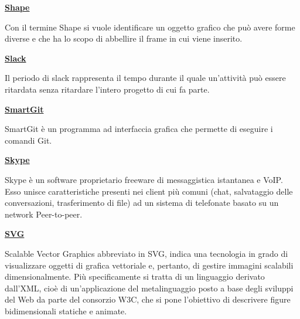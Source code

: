 \bigskip
\begin{addmargin}[0em]{0em}
	\textbf{\underline{Shape}}
\end{addmargin} 
	
\medskip
\begin{addmargin}[5em]{1em}	
Con il termine Shape si vuole identificare un oggetto grafico che può avere forme diverse e che ha lo scopo di abbellire il frame in cui viene inserito.
\end{addmargin}	

\bigskip
\begin{addmargin}[0em]{0em}
	\textbf{\underline{Slack}}
\end{addmargin} 
	
\medskip
\begin{addmargin}[5em]{1em}	
Il periodo di slack rappresenta il tempo durante il quale un'attività può essere ritardata senza ritardare l'intero progetto di cui fa parte.
\end{addmargin}	

\bigskip
\begin{addmargin}[0em]{0em}		
	\textbf{\underline{SmartGit}}
\end{addmargin} 
	
\medskip
\begin{addmargin}[5em]{1em}	
SmartGit è un programma ad interfaccia grafica che permette di eseguire i comandi Git.	
\end{addmargin}	

\bigskip
\begin{addmargin}[0em]{0em}		
	\textbf{\underline{Skype}}
\end{addmargin}
	 
\medskip
\begin{addmargin}[5em]{1em}	
Skype è un software proprietario freeware di messaggistica istantanea e VoIP. Esso unisce caratteristiche presenti nei client più comuni (chat, salvataggio delle conversazioni, trasferimento di file) ad un sistema di telefonate basato su un network Peer-to-peer.  
\end{addmargin}	

\bigskip
\begin{addmargin}[0em]{0em}		
	\textbf{\underline{SVG}}
	\end{addmargin} 
	
\medskip
\begin{addmargin}[5em]{1em}	
Scalable Vector Graphics abbreviato in SVG, indica una tecnologia in grado di visualizzare oggetti di grafica vettoriale e, pertanto, di gestire immagini scalabili dimensionalmente.
Più specificamente si tratta di un linguaggio derivato dall'XML, cioè di un'applicazione del metalinguaggio posto a base degli sviluppi del Web da parte del consorzio W3C, che si pone l'obiettivo di descrivere figure bidimensionali statiche e animate.
\end{addmargin}	

